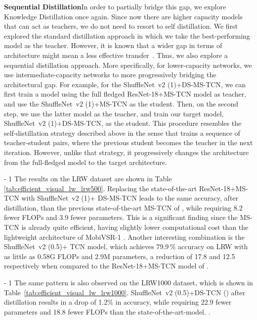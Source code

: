 \documentclass{article}
\begin{document}
\noindent\textbf{Sequential Distillation}\quad In order to partially bridge this gap, we explore Knowledge Distillation once again. Since now there are higher capacity models that can act as teachers, we do not need to resort to self distillation. We first explored the standard distillation approach in which we take the best-performing model as the teacher. However, it is known that a wider gap in terms of architecture might mean a less effective transfer~\cite{search_to_distill_cvpr20,Martinez2020Training}. Thus, we also explore a sequential distillation approach. More specifically, for lower-capacity networks, we use intermediate-capacity networks to more progressively bridging the architectural gap. For example, for the ShuffleNet~v2 (1)+DS-MS-TCN, we can first train a model using the full fledged ResNet-18+MS-TCN model as teacher, and use the ShuffleNet~v2 (1)+MS-TCN as the student. Then, on the second step, we use the latter model as the teacher, and train our target model, ShuffleNet~v2 (1)+DS-MS-TCN, as the student. This procedure resembles the self-distillation strategy described above in the sense that trains a sequence of teacher-student pairs, where the previous student becomes the teacher in the next iteration. However, unlike that strategy, it progressively changes the architecture from the full-fledged model to the target architecture.

\looseness - 1
The results on the LRW dataset are shown in Table \ref{tab:efficient_visual_lw_lrw500}. Replacing the state-of-the-art ResNet-18+MS-TCN with ShuffleNet~v2 (1)+ DS-MS-TCN leads to the same accuracy, after distillation, than the previous state-of-the-art MS-TCN of \cite{martinez2020lipreading}, while requiring 8.2 fewer FLOPs and 3.9 fewer parameters. This is a significant finding since the MS-TCN is already quite efficient, having slightly lower computational cost than the lightweight architecture of MobiVSR-1 \cite{shrivastava2019mobivsr}. Another interesting combination is the ShuffleNet~v2 (0.5)+ TCN model, which achieves 79.9\,\% accuracy on LRW with as little as 0.58G FLOPs and 2.9M parameters, a reduction of 17.8 and 12.5 respectively when compared to the ResNet-18+MS-TCN model of \cite{martinez2020lipreading}.

\looseness - 1
The same pattern is also observed on the LRW1000 dataset, which is shown in Table~\ref{tab:efficient_visual_lw_lrw1000}. ShuffleNet~v2 (0.5)+DS-TCN () after distillation results in a drop of 1.2\% in accuracy,  while requiring 22.9 fewer parameters and 18.8 fewer FLOPs than the state-of-the-art-model. \cite{martinez2020lipreading}.
\end{document}

